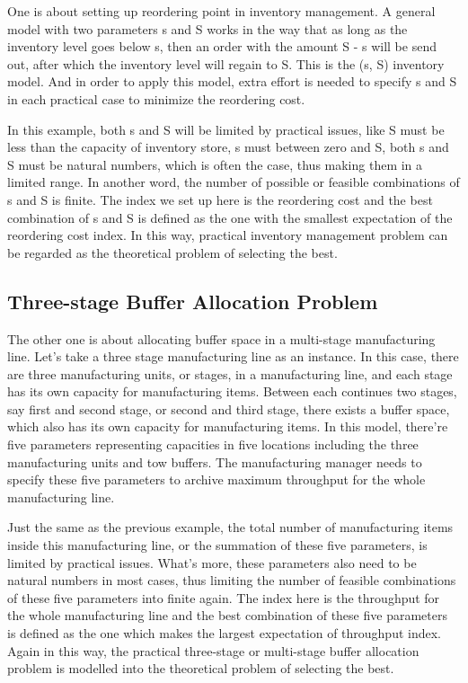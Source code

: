 \documentclass[12pt,a4]{report}
\begin{document}
One is about setting up reordering point in inventory management. A general model with two parameters s and S works in the way that as long as the inventory level goes below s, then an order with the amount S - s will be send out, after which the inventory level will regain to S. This is the (s, S) inventory model. And in order to apply this model, extra effort is needed to specify s and S in each practical case to minimize the reordering cost.

In this example, both s and S will be limited by practical issues, like S must be less than the capacity of inventory store, s must between zero and S, both s and S must be natural numbers, which is   often the case, thus making them in a limited range. In another word, the number of possible or feasible combinations of s and S is finite. The index we set up here is the reordering cost and the best combination of s and S is defined as the one with the smallest expectation of the reordering cost index. In this way, practical inventory management problem can be regarded as the theoretical problem of selecting the best.

\subsection{Three-stage Buffer Allocation Problem}

The other one is about allocating buffer space in a multi-stage manufacturing line. Let's take a three stage manufacturing line as an instance. In this case, there are three manufacturing units, or stages, in a manufacturing line, and each stage has its own capacity for manufacturing items. Between each continues two stages, say first and second stage, or second and third stage, there exists a buffer space, which also has its own capacity for manufacturing items. In this model, there're five parameters representing capacities in five locations including the three manufacturing units and tow buffers. The manufacturing manager needs to specify these five parameters to archive maximum throughput for the whole manufacturing line.

Just the same as the previous example, the total number of manufacturing items inside this manufacturing line, or the summation of these five parameters, is limited by practical issues. What's more, these parameters also need to be natural numbers in most cases, thus limiting the number of feasible combinations of these five parameters into finite again. The index here is the throughput for the whole manufacturing line and the best combination of these five parameters is defined as the one which makes the largest expectation of throughput index. Again in this way, the practical three-stage or multi-stage buffer allocation problem is modelled into the theoretical problem of selecting the best.
\end{document}
